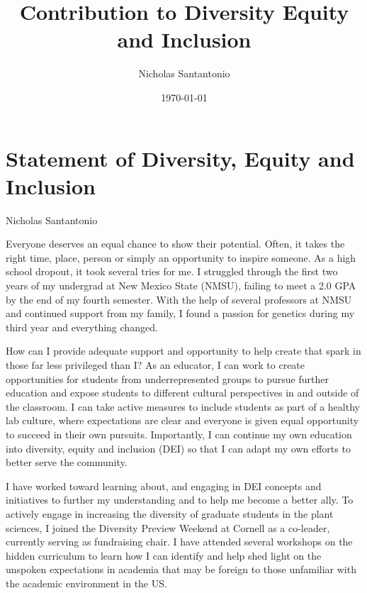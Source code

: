 \documentclass[11pt]{article}
\title{Contribution to Diversity Equity and Inclusion}
\author{Nicholas Santantonio}
\date{\today}
\begin{document}
\section*{\centering Statement of Diversity, Equity and Inclusion}
\begin{center} Nicholas Santantonio \end{center}

\noindent {}

\medskip

\noindent Everyone deserves an equal chance to show their potential. Often, it takes the right time, place, person or simply an opportunity to inspire someone. As a high school dropout, it took several tries for me. I struggled through the first two years of my undergrad at New Mexico State (NMSU), failing to meet a 2.0 GPA by the end of my fourth semester. With the help of several professors at NMSU and continued support from my family, I found a passion for genetics during my third year and everything changed.

How can I provide adequate support and opportunity to help create that spark in those far less privileged than I? As an educator, I can work to create opportunities for students from underrepresented groups to pursue further education and expose students to different cultural perspectives in and outside of the classroom. I can take active measures to include students as part of a healthy lab culture, where expectations are clear and everyone is given equal opportunity to succeed in their own pursuits. Importantly, I can continue my own education into diversity, equity and inclusion (DEI) so that I can adapt my own efforts to better serve the community. 

I have worked toward learning about, and engaging in DEI concepts and initiatives to further my understanding and to help me become a better ally. To actively engage in increasing the diversity of graduate students in the plant sciences, I joined the Diversity Preview Weekend at Cornell as a co-leader, currently serving as fundraising chair. I have attended several workshops on the hidden curriculum to learn how I can identify and help shed light on the unspoken expectations in academia that may be foreign to those unfamiliar with the academic environment in the US.
\end{document}
